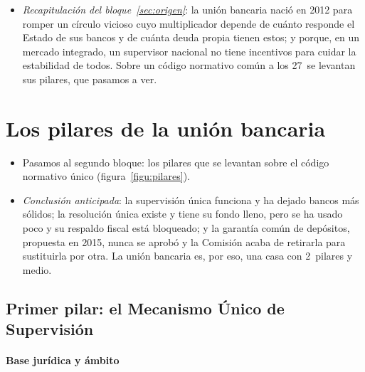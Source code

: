 \documentclass[11pt]{article}
\begin{document}
\begin{itemize}
\item \emph{Recapitulación del bloque~\ref{sec:origen}}: la unión bancaria nació en 2012 para romper un círculo vicioso cuyo multiplicador depende de cuánto responde el Estado de sus bancos y de cuánta deuda propia tienen estos; y porque, en un mercado integrado, un supervisor nacional no tiene incentivos para cuidar la estabilidad de todos. Sobre un código normativo común a los 27~se levantan sus pilares, que pasamos a ver.
\end{itemize}

\section{Los pilares de la unión bancaria}\label{sec:pilares}

\begin{itemize}
\item Pasamos al segundo bloque: los pilares que se levantan sobre el código normativo único (figura~\ref{figu:pilares}).
\item \emph{Conclusión anticipada}: la supervisión única funciona y ha dejado bancos más sólidos; la resolución única existe y tiene su fondo lleno, pero se ha usado poco y su respaldo fiscal está bloqueado; y la garantía común de depósitos, propuesta en 2015, nunca se aprobó y la Comisión acaba de retirarla para sustituirla por otra. La unión bancaria es, por eso, una casa con 2~pilares y medio.
\end{itemize}

\begin{infografia}[H]
\centering
\caption{Los pilares de la unión bancaria sobre el código normativo único}\label{figu:pilares}
\end{infografia}

\subsection{Primer pilar:\cortetitulo{} el Mecanismo Único de Supervisión}\label{sec:mus}

\paragraph{Base jurídica y ámbito}
\end{document}
